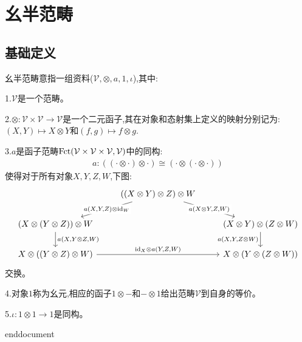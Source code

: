 \ifx\allfiles\undefined

	
	
\else
\fi
\chapter{幺半范畴}
\section{基础定义}
\begin{definition}[幺半范畴]{}
	幺半范畴意指一组资料($\mathcal{V},\otimes,a,1,\iota$),其中:
	
	1.$\mathcal{V}$是一个范畴。

	2.$\otimes:\mathcal{V}\times \mathcal{V} \to \mathcal{V}$是一个二元函子,其在对象和态射集上定义的映射分别记为:$(X,Y)\mapsto X\otimes Y$和$(f,g)\mapsto f\otimes g$.

	3.$a$是函子范畴$\rm{Fct}(\mathcal{V}\times\mathcal{V}\times \mathcal{V},\mathcal{V})$中的同构:
	\begin{align}
		a:((\cdot \otimes \cdot)\otimes \cdot) \cong (\cdot \otimes (\cdot \otimes \cdot))
	\end{align}
	使得对于所有对象$X,Y,Z,W$,下图:
	\[\centering
	\begin{tikzcd}
	& {((X\otimes Y)\otimes Z)\otimes W} \\
	{(X\otimes(Y\otimes Z))\otimes W} && {(X\otimes Y)\otimes (Z\otimes W)} \\
	{X\otimes((Y\otimes Z)\otimes W)} && {X\otimes(Y\otimes(Z\otimes W))}
	\arrow["{a(X,Y,Z)\otimes \mathrm{id}_W}"{description}, from=1-2, to=2-1]
	\arrow["{a(X\otimes Y,Z,W)}"{description}, from=1-2, to=2-3]
	\arrow["{a(X,Y\otimes Z,W)}", from=2-1, to=3-1]
	\arrow["{a(X,Y,Z\otimes W)}"', from=2-3, to=3-3]
	\arrow["{\mathrm{id}_X\otimes a(Y,Z,W)}", from=3-1, to=3-3]
\end{tikzcd}\]
   交换。

   4.对象$1$称为幺元,相应的函子$1\otimes -$和$-\otimes 1$给出范畴$\mathcal{V}$到自身的等价。

   5.$\iota:1\otimes 1\to 1$是同构。
\end{definition}
 \ifx\allfiles\undefined
	
	
	
	end{document}
	\else
	\fi